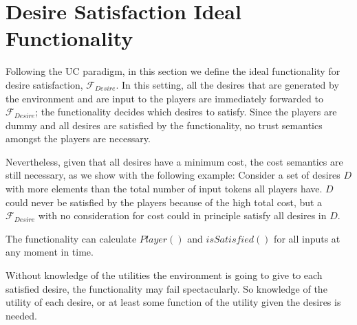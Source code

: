 \section{Desire Satisfaction Ideal Functionality}
  Following the UC paradigm, in this section we define the ideal functionality for desire satisfaction, $\mathcal{F}_{Desire}$.
  In this setting, all the desires that are generated by the environment and are input to the players are immediately forwarded
  to $\mathcal{F}_{Desire}$; the functionality decides which desires to satisfy. Since the players are dummy and all desires
  are satisfied by the functionality, no trust semantics amongst the players are necessary.
  
  Nevertheless, given that all desires have a minimum cost, the cost semantics are still necessary, as we show with the
  following example: Consider a set of desires $D$ with more elements than the total number of input tokens all players have.
  $D$ could never be satisfied by the players because of the high total cost, but a $\mathcal{F}_{Desire}$ with no
  consideration for cost could in principle satisfy all desires in $D$.

  The functionality can calculate $Player\left(\right)$ and $isSatisfied\left(\right)$ for all inputs at any moment in time.

  Without knowledge of the utilities the environment is going to give to each satisfied desire, the functionality may fail
  spectacularly. So knowledge of the utility of each desire, or at least some function of the utility given the desires is
  needed.
